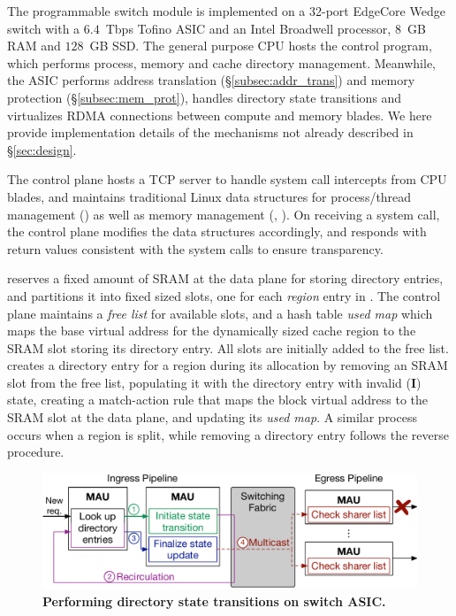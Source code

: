 The \mind programmable switch module is implemented on a 32-port EdgeCore Wedge switch with a $6.4$~Tbps Tofino ASIC and an Intel Broadwell processor, $8$~GB RAM and $128$~GB SSD. The general purpose CPU hosts the \mind control program, which performs process, memory and cache directory management. Meanwhile, the ASIC performs address translation (\S\ref{subsec:addr_trans}) and memory protection (\S\ref{subsec:mem_prot}), handles directory state transitions and virtualizes RDMA connections between compute and memory blades. We here provide implementation details of the mechanisms not already described in \S\ref{sec:design}.

 The control plane hosts a TCP server to handle system call intercepts from CPU blades, and maintains traditional Linux data structures for process/thread management () as well as memory management (, ). On receiving a system call, the control plane modifies the data structures accordingly, and responds with return values consistent with the system calls to ensure transparency.

 \mind reserves a fixed amount of SRAM at the data plane for storing directory entries, and partitions it into fixed sized slots, one for each \textit{region} entry in \mind. The control plane maintains a \textit{free list} for available slots, and a hash table \textit{used map} which maps the base virtual address for the dynamically sized cache region to the SRAM slot storing its directory entry. All slots are initially added to the free list. \mind creates a directory entry for a region during its allocation by removing an SRAM slot from the free list, populating it with the directory entry with invalid (\textbf{I}) state, creating a match-action rule that maps the block virtual address to the SRAM slot at the data plane, and updating its \textit{used map}. A similar process occurs when a region is split, while removing a directory entry follows the reverse procedure.

\begin{figure}[t]
  \centering
  \includegraphics[width=0.97\columnwidth]{fig/mind/cc.pdf}
  \vspace{-0.7em}
  \caption[Performing directory state transitions on switch ASIC]{\textbf{Performing directory state transitions on switch ASIC.}}
  \vspace{-0.5em}
  \label{fig:cc_example}
\end{figure}

